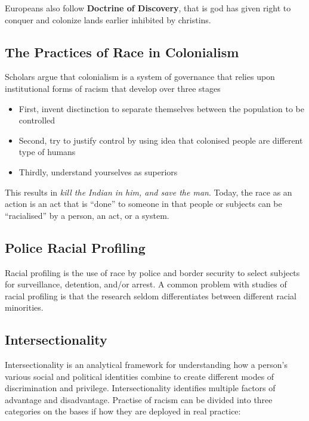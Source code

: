 \documentclass{article}
\begin{document}
Europeans also follow \textbf{Doctrine of Discovery}, that is god has given right to conquer and colonize lands earlier inhibited by christins.

\subsection{The Practices of Race in Colonialism}

Scholars argue that colonialism is a system of governance that relies upon institutional forms of racism that develop over three stages

\begin{itemize}
    \item First, invent disctinction to separate themselves between the population to be controlled
    
    \item Second, try to justify control by using idea that colonised people are different type of humans
    
    \item Thirdly, understand yourselves as superiors
\end{itemize}

This results in \textit{kill the Indian in him, and save the man}. Today, the race as an action is an act that is “done” to someone in that people or subjects can be “racialised” by a person, an act, or a system.

\subsection{Police Racial Profiling}

Racial profiling is the use of race by police and border security to select subjects for surveillance, detention, and/or arrest. A common problem with studies of racial profiling is that the research seldom differentiates between different racial minorities.

\subsection{Intersectionality}

Intersectionality is an analytical framework for understanding how a person's various social and political identities combine to create different modes of discrimination and privilege. Intersectionality identifies multiple factors of advantage and disadvantage. Practise of racism can be divided into three categories on the bases if how they are deployed in real practice:
\end{document}
